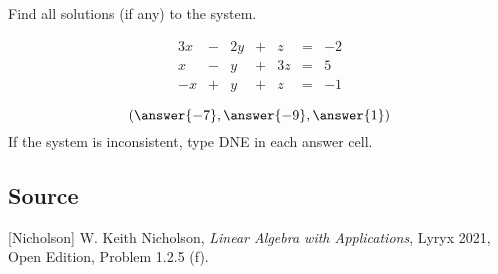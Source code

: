 \documentclass{ximera}
\author{}
\begin{document}
\begin{exercise}
Find all solutions (if any) to the system.  

$$\begin{matrix}
      3x& -&2y&+&z&=&-2\\
      x & -&y&+&3z&= &5\\
      -x&+&y&+&z&=&-1
    \end{matrix}$$

 $$(\answer{-7}, \answer{-9}, \answer{1})$$
If the system is inconsistent, type DNE in each answer cell.
\end{exercise}

\subsection*{Source}
[Nicholson] W. Keith Nicholson, {\it Linear Algebra with Applications}, Lyryx 2021, Open Edition, Problem 1.2.5 (f).
\end{document}
